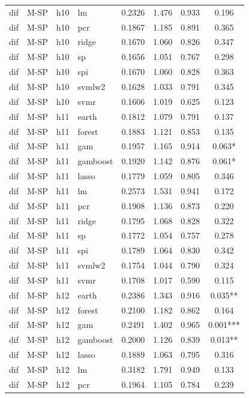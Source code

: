 \begin{ThreePartTable}
\begin{longtable}[t]{llclcccc}
dif & M-SP & h10 & lm & 0.2326 & 1.476 & 0.933 & 0.196\\
dif & M-SP & h10 & pcr & 0.1867 & 1.185 & 0.891 & 0.365\\
dif & M-SP & h10 & ridge & 0.1670 & 1.060 & 0.826 & 0.347\\
dif & M-SP & h10 & sp & 0.1656 & 1.051 & 0.767 & 0.298\\
dif & M-SP & h10 & spi & 0.1670 & 1.060 & 0.828 & 0.363\\
dif & M-SP & h10 & svmlw2 & 0.1628 & 1.033 & 0.791 & 0.345\\
dif & M-SP & h10 & svmr & 0.1606 & 1.019 & 0.625 & 0.123\\
\addlinespace
dif & M-SP & h11 & earth & 0.1812 & 1.079 & 0.791 & 0.137\\
dif & M-SP & h11 & forest & 0.1883 & 1.121 & 0.853 & 0.135\\
dif & M-SP & h11 & gam & 0.1957 & 1.165 & 0.914 & 0.063*\\
dif & M-SP & h11 & gamboost & 0.1920 & 1.142 & 0.876 & 0.061*\\
dif & M-SP & h11 & lasso & 0.1779 & 1.059 & 0.805 & 0.346\\
dif & M-SP & h11 & lm & 0.2573 & 1.531 & 0.941 & 0.172\\
dif & M-SP & h11 & pcr & 0.1908 & 1.136 & 0.873 & 0.220\\
dif & M-SP & h11 & ridge & 0.1795 & 1.068 & 0.828 & 0.322\\
dif & M-SP & h11 & sp & 0.1772 & 1.054 & 0.757 & 0.278\\
dif & M-SP & h11 & spi & 0.1789 & 1.064 & 0.830 & 0.342\\
dif & M-SP & h11 & svmlw2 & 0.1754 & 1.044 & 0.790 & 0.324\\
dif & M-SP & h11 & svmr & 0.1708 & 1.017 & 0.590 & 0.115\\
\addlinespace
dif & M-SP & h12 & earth & 0.2386 & 1.343 & 0.916 & 0.035**\\
dif & M-SP & h12 & forest & 0.2100 & 1.182 & 0.862 & 0.164\\
dif & M-SP & h12 & gam & 0.2491 & 1.402 & 0.965 & 0.001***\\
dif & M-SP & h12 & gamboost & 0.2000 & 1.126 & 0.839 & 0.013**\\
dif & M-SP & h12 & lasso & 0.1889 & 1.063 & 0.795 & 0.316\\
dif & M-SP & h12 & lm & 0.3182 & 1.791 & 0.949 & 0.133\\
dif & M-SP & h12 & pcr & 0.1964 & 1.105 & 0.784 & 0.239\\

\end{longtable}
\end{ThreePartTable}
